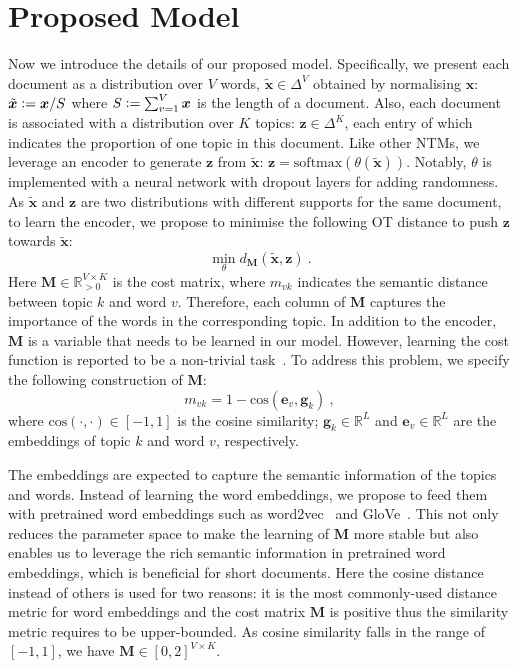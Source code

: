 \documentclass{article}
\renewcommand{\vec}{\boldsymbol}
\newcommand{\matr}[1]{\mathbf{#1}}
\newcommand{\bcdot}{\boldsymbol{\cdot}}
\newcommand{\eqdef}{\vcentcolon=}
\begin{document}
\section{Proposed Model}
\label{sec-nstm}
Now we introduce the details of our proposed model.
Specifically, we present each document as a distribution over $V$ words, $\tilde{\vec{x}} \in \Delta^V$ obtained by normalising $\vec{x}$:
 $\tilde{\vec{x}} \eqdef \vec{x}/ S$ where $S \eqdef \sum_{v=1}^V \vec{x}$ is the length of a document.
Also, each document is associated with a distribution over $K$ topics: $\vec{z} \in \Delta^K$, each entry of which indicates the proportion of one topic in this document.
Like other NTMs, we leverage an encoder to generate $\vec{z}$ from $\tilde{\vec{x}}$: $\vec{z} = \text{softmax}(\theta(\tilde{\vec{x}}))$. Notably, $\theta$ is implemented with a neural network with dropout layers for adding randomness.
As $\tilde{\vec{x}}$ and $\vec{z}$ are two distributions with different supports for the same document, to learn the encoder, we propose to minimise the following OT distance to push $\vec{z}$ towards $\tilde{\vec{x}}$:
\begin{equation}
\label{eq-nstm-1}
\min_{\theta} d_{\matr{M}}(\tilde{\vec{x}}, \vec{z})~.
\end{equation}
Here $\matr{M} \in \mathbb{R}_{>0}^{V \times K}$ is the cost matrix,
where $m_{vk}$ indicates the semantic distance between topic $k$ and word $v$. Therefore, each column of $\matr{M}$ captures the importance of the words in the corresponding topic.
In addition to the encoder, $\matr{M}$ is a variable that needs to be learned in our model. However, learning the cost function is reported to be a non-trivial task~\citep{cuturi2014ground,sun2020learning}. To address this problem, we specify the following construction of $\matr{M}$:
\begin{equation}
\label{eq-m}
m_{vk} = 1 - \text{cos}(\vec{e}_v, \vec{g}_k)~,
\end{equation} where $\text{cos}(\bcdot, \bcdot) \in [-1,1]$ is the cosine similarity; $\vec{g}_k \in \mathbb{R}^{L}$ and $\vec{e}_v \in \mathbb{R}^L$ are the embeddings of topic $k$ and word $v$, respectively. 

The embeddings are expected to capture the semantic information of the topics and words.
Instead of learning the word embeddings, we propose to feed them with pretrained word embeddings such as word2vec~\citep{mikolov2013efficient} and GloVe~\citep{pennington2014glove}. This not only reduces the parameter space to make the learning of $\matr{M}$ more stable but also enables us to leverage the rich semantic information in pretrained word embeddings, which is beneficial for short documents.
Here the cosine distance instead of others is used for two reasons: it is the most commonly-used distance metric for word embeddings and the cost matrix  $\matr{M}$ is positive thus the similarity metric requires to be upper-bounded. As cosine similarity falls in the range of $[-1, 1]$, we have $\matr{M} \in [0,2]^{V \times K}$.
\end{document}
